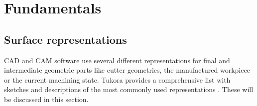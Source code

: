 \chapter{Fundamentals} %
\label{ch:fundamentals}


\section{Surface representations}
\label{sec:surface_representations}

CAD and CAM software use several different representations for final and intermediate geometric parts like cutter geometries, the manufactured workpiece or the current machining state.
Tukora provides a comprehensive list with sketches and descriptions of the most commonly used representations \cite{virtual_machining_review}. These will be discussed in this section. 

